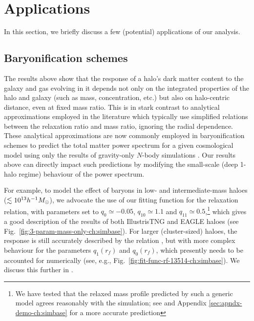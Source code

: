 \section{Applications}
\label{sec:applic-ch:simbase}
In this section, we briefly discuss a few (potential) applications of our analysis.

\subsection{Baryonification schemes}

The results above show that the response of a halo's dark matter content to the galaxy and gas evolving in it depends not only on the integrated properties of the halo and galaxy (such as mass, concentration, etc.) but also on halo-centric distance, even at fixed mass ratio. This is in stark contrast to analytical approximations employed in the literature which typically use simplified  relations between the relaxation ratio and mass ratio, ignoring the radial dependence. These analytical approximations are now commonly employed in baryonification schemes to predict the total matter power spectrum for a given cosmological model using only the results of gravity-only $N$-body simulations \citep{2015JCAP...12..049S,2018MNRAS.480.3962C,2021MNRAS.503.3596A}. Our results above can directly impact such predictions by modifying the small-scale (deep 1-halo regime) behaviour of the power spectrum. 

For example, to model the effect of baryons in low- and intermediate-mass haloes ($\lesssim10^{13}h^{-1}M_{\odot}$), we advocate the use of our fitting function  for the relaxation relation, with parameters set to $q_0\simeq-0.05$, $q_{10}\simeq1.1$ and $q_{11}\simeq0.5$,\footnote{We have tested that the relaxed mass profile predicted by such a generic model agrees reasonably with the simulation; see  and Appendix \ref{sec:apndx-demo-ch:simbase} for a more accurate prediction} which gives a good description of the results of both IllustrisTNG and EAGLE haloes (see Fig.~\ref{fig:3-param-mass-only-ch:simbase}). For larger (cluster-sized) haloes, the response is still accurately described by the relation , but with more complex behaviour for the parameters $q_1(r_f)$ and $q_0(r_f)$, which presently needs to be accounted for numerically (see, e.g., Fig.~\ref{fig:fit-func-rf-13514-ch:simbase}). We discuss this further in .




